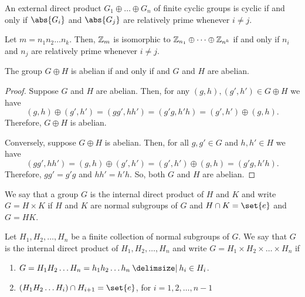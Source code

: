 \documentclass[11pt]{penrose}
\begin{document}
\begin{ncor}
    An external direct product $G_{1} \oplus \dots \oplus G_{n}$ of finite cyclic groups is cyclic if and only if $\abs{G_{i}}$ and $\abs{G_{j}}$ are relatively prime whenever $i \neq j$.
\end{ncor}

\begin{ncor}
    Let $m = n_{1} n_{2} \dots n_{k}$. Then, $\mathbb{Z}_{m}$ is isomorphic to $\mathbb{Z}_{n_{1}} \oplus \dots \oplus \mathbb{Z}_{n^{k}}$ if and only if $n_{i}$ and $n_{j}$ are relatively prime whenever $i \neq j$.
\end{ncor}

\begin{nlemma}
    The group $G \oplus H$ is abelian if and only if and $G$ and $H$ are abelian.
\end{nlemma}
\begin{proof}
    Suppose $G$ and $H$ are abelian. Then, for any $(g,h), (g',h') \in G \oplus H$ we have
    \begin{equation*}
        (g,h) \oplus (g',h')
        = (gg', hh')
        = (g'g, h'h)
        = (g',h') \oplus (g,h).
    \end{equation*}
    Therefore, $G \oplus H$ is abelian.

    Conversely, suppose $G \oplus H$ is abelian. Then, for all $g, g' \in G$ and $h, h' \in H$ we have
    \begin{equation*}
        (gg', hh')
        = (g,h) \oplus (g',h')
        = (g',h') \oplus (g,h)
        = (g'g, h'h).
    \end{equation*}
    Therefore, $gg' = g'g$ and $hh' = h'h$. So, both $G$ and $H$ are abelian.
\end{proof}

\begin{ndfn}
    We say that a group $G$ is the internal direct product of $H$ and $K$ and write $G = H \times K$ if $H$ and $K$ are normal subgroups of $G$ and $H \cap K = \set{e}$ and $G = HK$.
\end{ndfn}

\begin{ndfn}
    Let $H_{1}, H_{2}, \dots, H_{n}$ be a finite collection of normal subgroups of $G$. We say that $G$ is the internal direct product of $H_{1}, H_{2}, \dots, H_{n}$ and write $G = H_{1} \times H_{2} \times \dots \times H_{n}$ if
    \begin{enumerate}
        \item $G = H_{1} H_{2} \dots H_{n} = {h_{1} h_{2} \dots h_{n} \st h_{i} \in H_{i}}$.
        \item $(H_{1} H_{2} \dots H_{i}) \cap H_{i+1} = \set{e}$, for $i = 1,2,\dots,n-1$
    \end{enumerate}
\end{ndfn}
\end{document}
